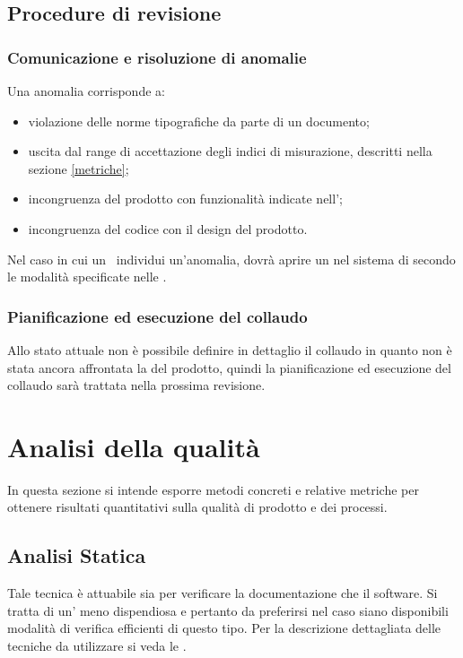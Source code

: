 \documentclass[12pt,a4paper]{article}
\begin{document}
\subsection{Procedure di revisione}

\subsubsection{Comunicazione e risoluzione di anomalie}
Una anomalia corrisponde a:

\begin{itemize}
	\item violazione delle norme tipografiche da parte di un documento;
	\item uscita dal range di accettazione degli indici di misurazione, descritti nella sezione \ref{metriche};
	\item incongruenza del prodotto con funzionalità indicate nell'\AdR;
	\item incongruenza del codice con il design del prodotto.
\end{itemize}

Nel caso in cui un \VR\ individui un'anomalia, dovrà aprire un  nel sistema di  secondo le modalità specificate nelle \NdP.

\subsubsection{Pianificazione ed esecuzione del collaudo}
Allo stato attuale non è possibile definire in dettaglio il collaudo in quanto non è stata ancora affrontata la  del prodotto, quindi la pianificazione ed esecuzione del collaudo sarà trattata nella prossima revisione.

\newpage

\section{Analisi della qualità}\label{analisi}
In questa sezione si intende esporre metodi concreti e relative metriche per ottenere risultati quantitativi sulla qualità di prodotto e dei processi. 

\subsection{Analisi Statica} 
Tale tecnica è attuabile sia per verificare la documentazione che il software. Si tratta di un' meno dispendiosa e pertanto da preferirsi nel caso siano disponibili modalità di verifica efficienti di questo tipo. Per la descrizione dettagliata delle tecniche da utilizzare si veda le \NdP.
\end{document}
